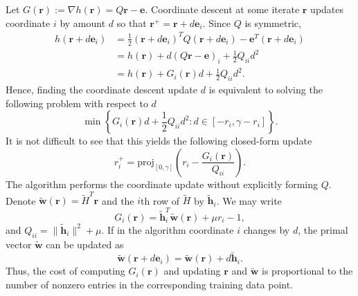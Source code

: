 \documentclass[twoside,11pt]{article}
\newcommand\proj{\mathrm{proj}}
\renewcommand\r{\bm{r}}
\newcommand\w{\bm{w}}
\newcommand\e{\bm{e}}
\newcommand\tw{\tilde{\w}}
\newcommand\h{\bm{h}}
\newcommand\tth{\tilde{\h}}
\newcommand\tH{\tilde{H}}
\begin{document}
    Let $G(\r) := \nabla h(\r) = Q\r - \e$. Coordinate descent at some iterate $\r$ updates coordinate $i$ by amount $d$ so that $\r^+ = \r + d\e_i$. Since $Q$ is symmetric,
    \begin{align*}
        h(\r + d\e_i) &= \frac{1}{2}(\r + d\e_i)^TQ(\r + d\e_i) - \e^T(\r + d\e_i)\\
                      &= h(\r) + d(Q\r - \e)_i + \frac{1}{2}Q_{ii}d^2\\
                      &= h(\r) + G_i(\r)d + \frac{1}{2}Q_{ii}d^2.
    \end{align*}
    Hence, finding the coordinate descent update $d$ is equivalent to solving the following problem with respect to $d$
    \[
        \min\left\{G_i(\r)d+\frac{1}{2}Q_{ii}d^2 : d \in [-r_i,\gamma-r_i] \right\}.
    \]
    It is not difficult to see that this yields the following closed-form update
    \[
        r_i^+ = \proj_{[0,\gamma]}\left(r_i - \frac{G_i(\r)}{Q_{ii}}\right).
    \]
    The algorithm performs the coordinate update without explicitly forming $Q$. Denote $\tw(\r) = \tH^T\r$ and the $i$th row of $\tH$ by $\tth_i$.
    We may write
    \[
        G_i(\r) = \tth_i^T\tw(\r) + \mu r_i - 1,
    \]
    and $Q_{ii} = \|\tth_i\|^2 + \mu$. If in the algorithm coordinate $i$ changes by $d$, the primal vector $\tw$ can be updated as
    \[
        \tw(\r + d\e_i) = \tw(\r) + d\tth_i.
    \]
    Thus, the cost of computing $G_i(\r)$ and updating $\r$ and $\tw$ is proportional to the number of nonzero entries in the corresponding training data point.
\end{document}
